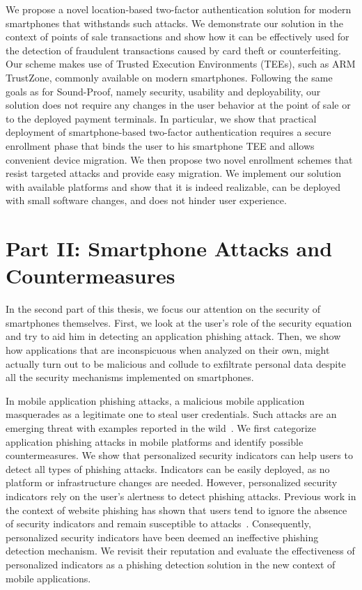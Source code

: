We propose a novel location-based two-factor authentication solution for
modern smartphones that withstands such attacks. We demonstrate our solution in
the context of points of sale transactions and show how it can be effectively
used for the detection of fraudulent transactions caused by card theft or
counterfeiting. Our scheme makes use of Trusted Execution Environments (TEEs),
such as ARM TrustZone, commonly available on modern smartphones. Following the
same goals as for Sound-Proof, namely security, usability and deployability,
our solution does not require any changes in the user behavior at the point of
sale or to the deployed payment terminals. In particular, we show that
practical deployment of smartphone-based two-factor authentication requires
a secure enrollment phase that binds the user to his smartphone TEE and allows
convenient device migration. We then propose two novel enrollment schemes that
resist targeted attacks and provide easy migration. We implement our solution
with available platforms and show that it is indeed realizable, can be
deployed with small software changes, and does not hinder user experience.

\section{Part II: Smartphone Attacks and Countermeasures}
\label{sec:intro_part2}

In the second part of this thesis, we focus our attention on the security of smartphones themselves. First, we look at the user's role of the security equation and try to aid him in detecting an application phishing attack. Then, we show how applications that are inconspicuous when analyzed on their own, might actually turn out to be malicious and collude to exfiltrate personal data despite all the security mechanisms implemented on smartphones. 

In mobile application phishing attacks, a malicious mobile application
masquerades as a legitimate one to steal user credentials. Such attacks are an
emerging threat with examples reported in the wild~\cite{droid09, securelist,
zhou12ndss}. We first categorize application phishing attacks in mobile
platforms and identify possible countermeasures. We show that personalized
security indicators can help users to detect all types of phishing attacks.
Indicators can be easily deployed, as no platform or infrastructure changes are
needed. However, personalized security indicators rely on the user's alertness
to detect phishing attacks. Previous work in the context of website phishing
has shown that users tend to ignore the absence of security indicators and
remain susceptible to attacks~\cite{schechter07sp,lee-w2sp14}. Consequently,
personalized security indicators have been deemed an ineffective phishing
detection mechanism. We revisit their reputation and evaluate the effectiveness
of personalized indicators as a phishing detection solution in the new context
of mobile applications. 

